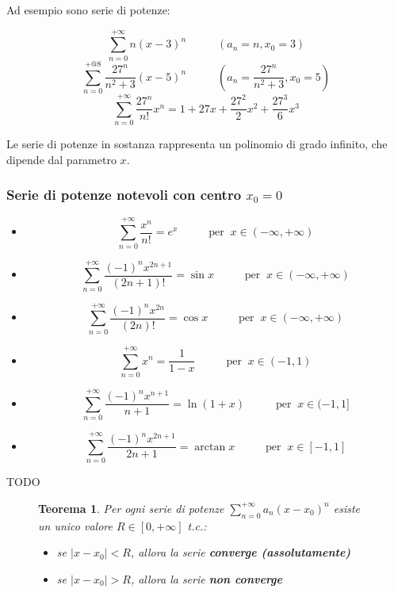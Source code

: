 \documentclass[a4paper]{article}
\newtheorem{theorem}{Teorema}
\theoremstyle{break}
\theoremstyle{break}
\theoremstyle{break}
\theoremstyle{break}
\begin{document}
Ad esempio sono serie di potenze:
\begin{figure}[H]
  \begin{example}
    \[
      \sum_{n=0}^{+\infty} n(x-3)^n \;\;\;\;\;\;\;\;\;\; (a_n=n, x_0=3)
    \] 
    \[
      \sum_{n=0}^{+@8} \frac{27^n}{n^2+3}(x-5)^n \;\;\;\;\;\;\;\;\;\; (a_n = \frac{27^n}{n^2+3}, x_0=5)
    \] 
    \[
      \sum_{n=0}^{+\infty} \frac{27^n}{n!}x^n = 1+27x+\frac{27^2}{2}x^2+\frac{27^3}{6}x^3
    \] 
  \end{example}
\end{figure}
Le serie di potenze in sostanza rappresenta un polinomio di grado infinito, che dipende dal parametro \( x \).
\subsubsection{Serie di potenze notevoli con centro \texorpdfstring{\( x_0 = 0 \)}{x\_0 = 0}}
\begin{itemize}
  \item \[
      \sum_{n=0}^{+\infty} \frac{x^n}{n!} = e^x \;\;\;\;\;\;\;\;\;\; \text{per}\;\; x \in (-\infty, +\infty)
    \] 
  \item \[
      \sum_{n=0}^{+\infty} \frac{(-1)^nx^{2n+1}}{(2n+1)!} = \sin x \;\;\;\;\;\;\;\;\;\; \text{per}\;\; x \in (-\infty, +\infty)
    \] 
  \item \[
      \sum_{n=0}^{+\infty} \frac{(-1)^nx^{2n}}{(2n)!} = \cos x \;\;\;\;\;\;\;\;\;\; \text{per}\;\; x \in (-\infty, +\infty)
    \] 
  \item \[
      \sum_{n=0}^{+\infty} x^n = \frac{1}{1-x} \;\;\;\;\;\;\;\;\;\; \text{per}\;\; x \in (-1, 1)
    \] 
  \item \[
      \sum_{n=0}^{+\infty} \frac{(-1)^nx^{n+1}}{n+1} = \ln(1+x) \;\;\;\;\;\;\;\;\;\; \text{per}\;\; x \in (-1, 1]
    \] 
  \item \[
      \sum_{n=0}^{+\infty} \frac{(-1)^n x^{2n+1}}{2n+1} = \arctan x \;\;\;\;\;\;\;\;\;\; \text{per}\;\; x \in [-1, 1]
    \] 
\end{itemize}
TODO
\begin{figure}[H]
  \begin{theorem}
    Per ogni serie di potenze \( \sum_{n=0}^{+\infty} a_n(x-x_0)^n \) esiste un unico valore \( R \in [0, +\infty] \) t.c.:
    \begin{itemize}
      \item se \( |x-x_0| < R \), allora la serie \textbf{converge (assolutamente)}
      \item se \( |x-x_0| > R \), allora la serie \textbf{non converge}
    \end{itemize}
    \label{D2}
    \label{Teorema del raggio di convergenza}
  \end{theorem}
\end{figure}
\end{document}

